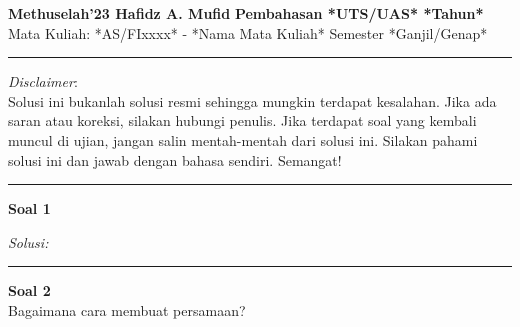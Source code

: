 \documentclass[a4paper, 11pt]{article}
\newenvironment{problem}[2][Soal]
    { \begin{mdframed}[backgroundcolor=violet!20] \textbf{#1 #2} \\}
    {  \end{mdframed}}
\newenvironment{solution}
    {\textit{Solusi:}}
    {}
\begin{document}
\noindent
\large\textbf{Methuselah'23 Hafidz A. Mufid} \hfill \textbf{Pembahasan *UTS/UAS* *Tahun*}   \\
\normalsize Mata Kuliah: *AS/FIxxxx* - *Nama Mata Kuliah* \hfill Semester *Ganjil/Genap*\\
\noindent\rule{7in}{2.8pt}
\begin{center}
    \textit{Disclaimer}:\\
    Solusi ini bukanlah solusi resmi sehingga mungkin terdapat kesalahan. Jika ada saran atau koreksi, silakan hubungi penulis. Jika terdapat soal yang kembali muncul di ujian, jangan salin mentah-mentah dari solusi ini. Silakan pahami solusi ini dan jawab dengan bahasa sendiri. Semangat!
\end{center}
\noindent\rule{7in}{2.8pt}
\begin{problem}{1}
\text{[CO 1]} \lipsum[1]
\end{problem}

\begin{solution}
\lipsum[1-2]
\end{solution} 
\noindent\rule{7in}{2.8pt}

\pagebreak


\begin{problem}{2}
\text{[CO 2]} Bagaimana cara membuat persamaan? 
\end{problem}
\end{document}
